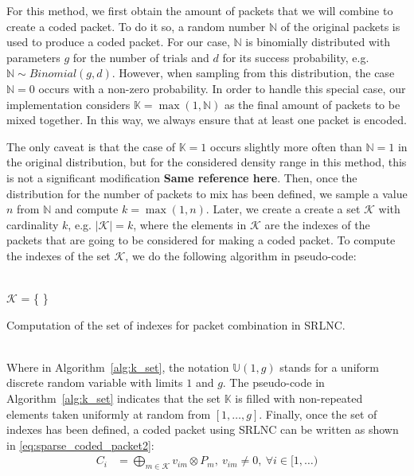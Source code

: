 For this method, we first obtain the amount of packets
that we will combine to create a coded packet. To do it so, a random
number $\mathbb{N}$ of the original packets is used to produce a
coded packet. For our case, $\mathbb{N}$ is binomially distributed
with parameters $g$ for the number of trials and $d$ for its success
probability, e.g. $\mathbb{N} \sim Binomial(g,d)$. However,
when sampling from this distribution, the case
$\mathbb{N} = 0$ occurs with a non-zero probability. In order to handle
this special case, our implementation considers
$\mathbb{K} = \max(1,\mathbb{N})$ as the final amount of packets to be
mixed together. In this way, we always ensure that at least one packet is
encoded.

The only caveat is that the case of $\mathbb{K} = 1$ occurs slightly
more often than $\mathbb{N} = 1$ in the original distribution, but for
the considered density range in this method, this is not a significant
modification \textbf{Same reference here}. Then, once the distribution for the
number of packets to mix has been defined, we sample a value $n$ from
$\mathbb{N}$ and compute $k = \max(1,n)$. Later, we create a create a
set $\mathcal{K}$ with cardinality $k$, e.g. $|\mathcal{K}| = k$,
where the elements in $\mathcal{K}$ are the indexes of the packets that are
going to be considered for making a coded packet. To compute the indexes
of the set $\mathcal{K}$, we do the following algorithm in pseudo-code: \\
\ \\
\begin{algorithm}[H]
 \label{alg:k_set}
 $\mathcal{K}$ = \{ \}\;
 \caption{Computation of the set of indexes for packet combination in SRLNC.}
\end{algorithm}
\ \\
Where in Algorithm~\ref{alg:k_set}, the notation $\mathbb{U}(1,g)$ stands
for a uniform discrete random variable with limits $1$ and $g$. The
pseudo-code in Algorithm~\ref{alg:k_set} indicates that the set $\mathbb{K}$
is filled with non-repeated elements taken uniformly at random from
$[1,\ldots,g]$. Finally, once the set of indexes has been defined, a coded
packet using \ac{SRLNC} can be written as shown in
\eqref{eq:sparse_coded_packet2}:
%
\begin{align} \label{eq:sparse_coded_packet2}
    C_i  &= \bigoplus_{m \in \mathcal{K}} v_{im} \otimes P_{m},\ v_{im} \neq 0,\ \forall i \in [1,\ldots)
\end{align}

